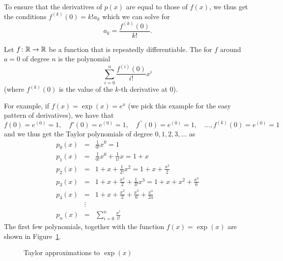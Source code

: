 To ensure that the derivatives of $p(x)$ are equal to those of $f(x)$, we
thus get the conditions $f^{(k)}(0)=k! a_k$ which we can solve for
\[
a_k=\frac{f^{(k)}(0)}{k!}.
\]
\begin{defn}
Let $f\colon{\mathbb R}\to{\mathbb R}$ be a function that is repeatedly differentiable.
The 
for $f$ around $a=0$ of degree $n$ is the polynomial
\[
\sum_{i=0}^n\frac{f^{(i)}(0)}{i!} x^i
\]
(where $f^{(k)}(0)$ is the value of the $k$-th derivative at $0$).
\end{defn}
For example, if $f(x)=\exp(x)=e^x$ (we pick this example for the easy pattern of
derivatives), we have that
\[
f(0)=e^{(0)}=1,\quad
f'(0)=e^{(0)}=1,\quad
f^{\prime\prime}(0)=e^{(0)}=1,\quad\ldots,
f^{(k)}(0)=e^{(0)}=1
\]
and we thus get the Taylor polynomials of degree $0,1,2,3,\ldots$ as
\begin{eqnarray*}
p_0(x)&=&\frac{1}{0!}x^0=1\\
p_1(x)&=&\frac{1}{0!}x^0+\frac{1}{1!}x=1+x\\
p_2(x)&=&1+x+\frac{1}{2!}x^2=1+x+\frac{x^2}{2}\\
p_3(x)&=&1+x+\frac{x^2}{2}+\frac{1}{3!}x^3=1+x+x^2+\frac{x^3}{6}\\
p_4(x)&=&1+x+\frac{x^2}{2}+\frac{x^3}{6}+\frac{x^4}{24}\\
&\vdots&\\
p_n(x)&=&\sum_{i=0}^n \frac{x^i}{i!}
\end{eqnarray*}
The first few polynomials, together with the function $f(x)=\exp(x)$ are
shown in Figure~\ref{figtayexp}.
\begin{figure}
\begin{center}
\end{center}
\caption{Taylor approximations to $\exp(x)$}
\label{figtayexp}
\end{figure}


